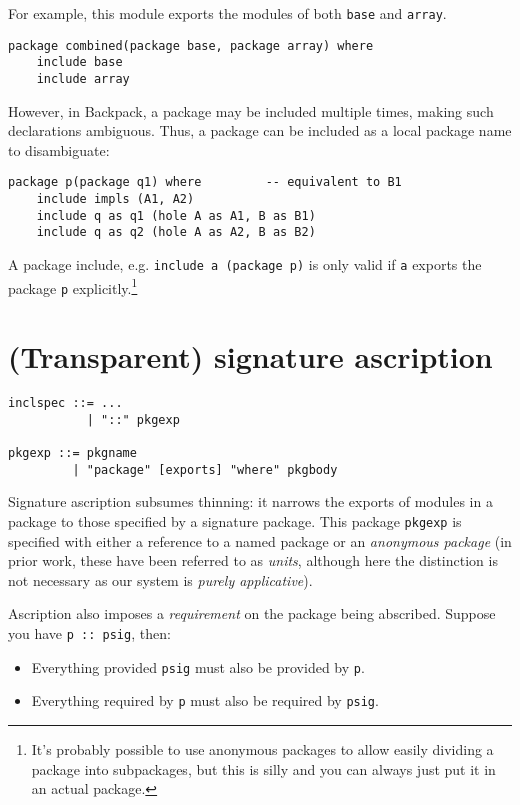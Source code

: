 \documentclass{article}
\begin{document}
For example, this module exports the modules of both \verb|base|
and \verb|array|.

\begin{verbatim}
package combined(package base, package array) where
    include base
    include array
\end{verbatim}

However, in Backpack, a package may be included multiple times, making
such declarations ambiguous.  Thus, a package can be included as a local
package name to disambiguate:

\begin{verbatim}
package p(package q1) where         -- equivalent to B1
    include impls (A1, A2)
    include q as q1 (hole A as A1, B as B1)
    include q as q2 (hole A as A2, B as B2)
\end{verbatim}

A package include, e.g. \verb|include a (package p)| is only valid if
\verb|a| exports the package \verb|p| explicitly.\footnote{It's probably
possible to use anonymous packages to allow easily dividing a package
into subpackages, but this is silly and you can always just put it
in an actual package.}

\section{(Transparent) signature ascription}

\begin{verbatim}
inclspec ::= ...
           | "::" pkgexp

pkgexp ::= pkgname
         | "package" [exports] "where" pkgbody
\end{verbatim}

Signature ascription subsumes thinning: it narrows the exports
of modules in a package to those specified by a signature
package. This package \verb|pkgexp| is specified with either
a reference to a named package or an \emph{anonymous package}
(in prior work, these have been referred to as \emph{units},
although here the distinction is not necessary as our system
is \emph{purely applicative}).

Ascription also imposes a \emph{requirement} on the package
being abscribed.  Suppose you have \verb|p :: psig|, then:

\begin{itemize}
    \item Everything provided \verb|psig| must also
    be provided by \verb|p|.
    \item Everything required by \verb|p| must also
    be required by \verb|psig|.
\end{itemize}
\end{document}

